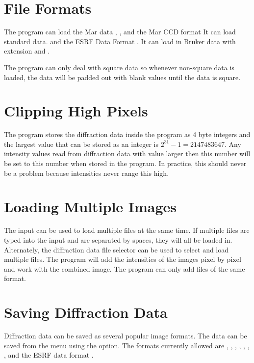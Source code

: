 \section{File Formats}

The program can load the Mar data , 
, and the  Mar CCD format
It can load standard  data. 
and the ESRF Data Format .
It can load in Bruker data with extension 
 and .


The program can only deal with square data so whenever non-square
data is loaded, the data will be padded out with blank values
until the data is square.

\section{Clipping High Pixels}

The program stores the diffraction data inside the program as 4 byte integers and 
the largest value that can be stored as an integer is $2^{31}-1 = 2147483647$.
Any intensity values read from diffraction data with value larger then 
this number will be set to this number when stored in the program. In practice, 
this should never be a problem because intensities never range this high.

\section{Loading Multiple Images}

The  input can be used to load multiple files
at the same time.
If multiple files are typed into the  input and
are separated by spaces, they will all be loaded in. 
Alternately, the diffraction data file 
selector can be used to select and load multiple files.
The program will add the intensities of the images pixel by pixel 
and work with the combined image. The program can only add files 
of the same format.

\section{Saving Diffraction Data}

Diffraction data can be saved as several popular image formats. 
The data can be saved from the  menu using 
the  option. The formats currently allowed are , 
, , , , , , and 
the ESRF data format .


